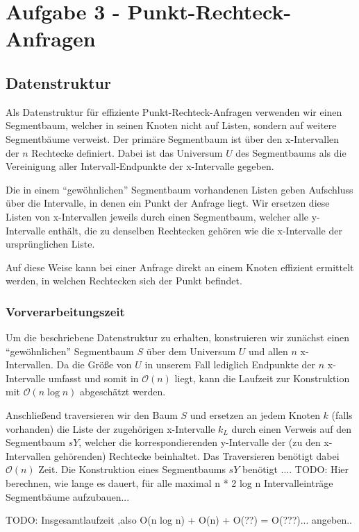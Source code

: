 \documentclass[a4paper]{article}
\begin{document}
\section*{Aufgabe 3 - Punkt-Rechteck-Anfragen}

\subsection*{Datenstruktur}
Als Datenstruktur für effiziente Punkt-Rechteck-Anfragen verwenden wir einen Segmentbaum, 
welcher in seinen Knoten nicht auf Listen, sondern auf weitere Segmentbäume verweist.
Der primäre Segmentbaum ist über den x-Intervallen der $n$ Rechtecke definiert. 
Dabei ist das Universum $U$ des Segmentbaums als die Vereinigung aller Intervall-Endpunkte
der x-Intervalle gegeben. 

Die in einem "`gewöhnlichen"' Segmentbaum vorhandenen Listen geben Aufschluss über die 
Intervalle, in denen ein Punkt der Anfrage liegt. Wir ersetzen diese Listen von 
x-Intervallen jeweils durch einen Segmentbaum, welcher alle y-Intervalle enthält, 
die zu denselben Rechtecken gehören wie die x-Intervalle der ursprünglichen Liste.

Auf diese Weise kann bei einer Anfrage direkt an einem Knoten effizient ermittelt werden, 
in welchen Rechtecken sich der Punkt befindet. 


\subsubsection*{Vorverarbeitungszeit}
Um die beschriebene Datenstruktur zu erhalten, konstruieren wir zunächst einen
"`gewöhnlichen"' Segmentbaum $S$ über dem Universum $U$ und allen 
$n$ x-Intervallen. Da die Größe von $U$ in unserem Fall 
lediglich Endpunkte der $n$ x-Intervalle umfasst und somit in $\mathcal{O}(n)$ liegt, 
kann die Laufzeit zur Konstruktion mit $\mathcal{O}(n \log n)$ abgeschätzt werden.

Anschließend traversieren wir den Baum $S$ und ersetzen an jedem Knoten $k$ (falls vorhanden)
die Liste der zugehörigen x-Intervalle $k_L$ durch einen Verweis auf 
den Segmentbaum $sY$, welcher die korrespondierenden y-Intervalle der (zu den x-Intervallen 
gehörenden) Rechtecke beinhaltet. Das Traversieren benötigt dabei $\mathcal{O}(n)$ Zeit.
Die Konstruktion eines Segmentbaums $sY$ benötigt ....
TODO: Hier berechnen, wie lange es dauert, für alle maximal n * 2 log n Intervalleinträge
Segmentbäume aufzubauen...

TODO: Insgesamtlaufzeit ,also O(n log n) + O(n) + O(??) = O(???)... angeben.. 
\end{document}
